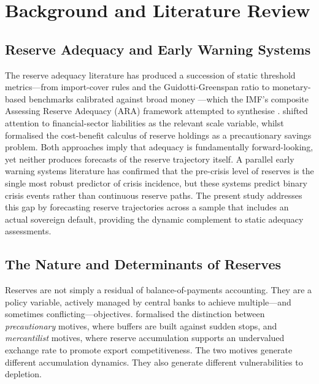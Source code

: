 \documentclass[12pt,a4paper]{article}
\begin{document}
\section{Background and Literature Review}

\subsection{Reserve Adequacy and Early Warning Systems}

The reserve adequacy literature has produced a succession of static threshold metrics---from import-cover rules and the Guidotti-Greenspan ratio \citep{Greenspan1999} to monetary-based benchmarks calibrated against broad money \citep{Calvo1996,Wijnholds2001}---which the IMF's composite Assessing Reserve Adequacy (ARA) framework attempted to synthesise \citep{IMF2011,IMF2015}. \cite{Obstfeld2010} shifted attention to financial-sector liabilities as the relevant scale variable, whilst \cite{JeanneRanciere2011} formalised the cost-benefit calculus of reserve holdings as a precautionary savings problem. Both approaches imply that adequacy is fundamentally forward-looking, yet neither produces forecasts of the reserve trajectory itself. A parallel early warning systems literature \citep{KaminskyLizondoReinhart1998,FrankelSaravelos2012} has confirmed that the pre-crisis level of reserves is the single most robust predictor of crisis incidence, but these systems predict binary crisis events rather than continuous reserve paths. The present study addresses this gap by forecasting reserve trajectories across a sample that includes an actual sovereign default, providing the dynamic complement to static adequacy assessments.

\subsection{The Nature and Determinants of Reserves}

Reserves are not simply a residual of balance-of-payments accounting. They are a policy variable, actively managed by central banks to achieve multiple---and sometimes conflicting---objectives. \cite{AizenmanLee2007} formalised the distinction between \textit{precautionary} motives, where buffers are built against sudden stops, and \textit{mercantilist} motives, where reserve accumulation supports an undervalued exchange rate to promote export competitiveness. The two motives generate different accumulation dynamics. They also generate different vulnerabilities to depletion.
\end{document}
